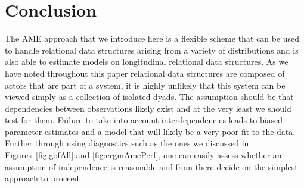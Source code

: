 \section{\textbf{Conclusion}}

The AME approach that we introduce here is a flexible scheme that can be used to handle relational data structures arising from a variety of distributions and is also able to estimate models on longitudinal relational data structures. As we have noted throughout this paper relational data structures are composed of actors that are part of a system, it is highly unlikely that this system can be viewed simply as a collection of isolated dyads. The assumption should be that dependencies between observations likely exist and at the very least we should test for them. Failure to take into account interdependencies leads to biased parameter estimates and a model that will likely be a very poor fit to the data. Further through using diagnostics such as the ones we discussed in Figures~\ref{fig:gofAll} and \ref{fig:ergmAmePerf}, one can easily assess whether an assumption of independence is reasonable and from there decide on the simplest approach to proceed.

